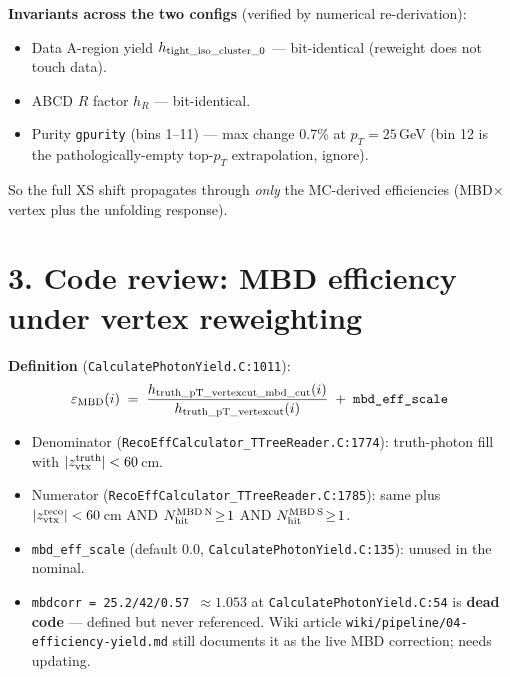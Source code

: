 \documentclass[11pt,a4paper]{article}
\begin{document}
\noindent\textbf{Invariants across the two configs} (verified by numerical re-derivation):
\begin{itemize}
\item Data A-region yield $h_{\rm tight\_iso\_cluster\_0}$ --- bit-identical (reweight does not touch data).
\item ABCD $R$ factor $h_R$ --- bit-identical.
\item Purity \texttt{gpurity} (bins 1--11) --- max change 0.7\% at $p_T=25$\,GeV (bin 12 is the pathologically-empty top-$p_T$ extrapolation, ignore).
\end{itemize}
So the full XS shift propagates through \emph{only} the MC-derived efficiencies (MBD$\times$vertex plus the unfolding response).

\section*{3. Code review: MBD efficiency under vertex reweighting}

\noindent\textbf{Definition} (\texttt{CalculatePhotonYield.C:1011}):
\[
\varepsilon_{\rm MBD}(i) \;=\;
\frac{h_{\rm truth\_pT\_vertexcut\_mbd\_cut}(i)}{h_{\rm truth\_pT\_vertexcut}(i)} \;+\; \texttt{mbd\_eff\_scale}
\]
\begin{itemize}
\item Denominator (\texttt{RecoEffCalculator\_TTreeReader.C:1774}): truth-photon fill with $|z_{\rm vtx}^{\rm truth}|<60$\,cm.
\item Numerator (\texttt{RecoEffCalculator\_TTreeReader.C:1785}): same plus $|z_{\rm vtx}^{\rm reco}|<60$\,cm AND $N_{\rm hit}^{\rm MBD\,N}\!\ge\!1$ AND $N_{\rm hit}^{\rm MBD\,S}\!\ge\!1$.
\item \texttt{mbd\_eff\_scale} (default 0.0, \texttt{CalculatePhotonYield.C:135}): unused in the nominal.
\item \texttt{mbdcorr = 25.2/42/0.57 $\approx 1.053$} at \texttt{CalculatePhotonYield.C:54} is \textbf{dead code} --- defined but never referenced. Wiki article \texttt{wiki/pipeline/04-efficiency-yield.md} still documents it as the live MBD correction; needs updating.
\end{itemize}
\end{document}
